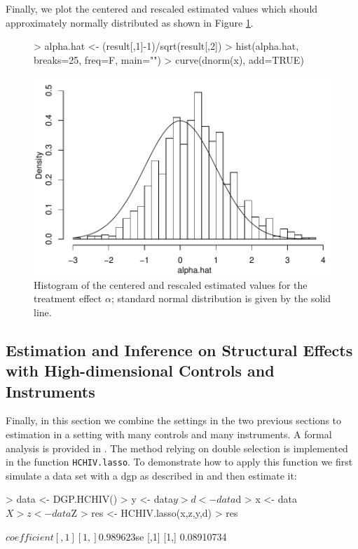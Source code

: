 \documentclass{amsart}
\begin{document}
Finally, we plot the centered and rescaled estimated values which should approximately normally distributed as shown in Figure \ref{IV}.

\begin{figure}[h!]
\begin{center}
\label{IV}
\begin{Schunk}
\begin{Sinput}
> alpha.hat <- (result[,1]-1)/sqrt(result[,2])
> hist(alpha.hat, breaks=25, freq=F, main="")
> curve(dnorm(x), add=TRUE)
\end{Sinput}
\end{Schunk}
\includegraphics{HDM-IV}
\end{center}
\caption{Histogram of the centered and rescaled estimated values for the treatment effect $\alpha$; standard normal distribution is given by the solid line.}
\end{figure}

\subsection{Estimation and Inference on Structural Effects with High-dimensional Controls and Instruments}
Finally, in this section we combine the settings in the two previous sections to estimation in a setting with many controls and many instruments. A formal analysis is provided in \cite{CHS:2015}. The method relying on double selection is implemented in the function \texttt{HCHIV.lasso}.
To demonstrate how to apply this function we first simulate a data set with a dgp as described in  \cite{CHS:2015} and then estimate it:

\begin{Schunk}
\begin{Sinput}
>  data <- DGP.HCHIV()
>   y <- data$y
>   d <- data$d
>   x <- data$X
>   z <- data$Z
>   res <- HCHIV.lasso(x,z,y,d)
>   res
\end{Sinput}
\begin{Soutput}
$coefficient
         [,1]
[1,] 0.989623

$se
           [,1]
[1,] 0.08910734
\end{Soutput}
\end{Schunk}
\end{document}
